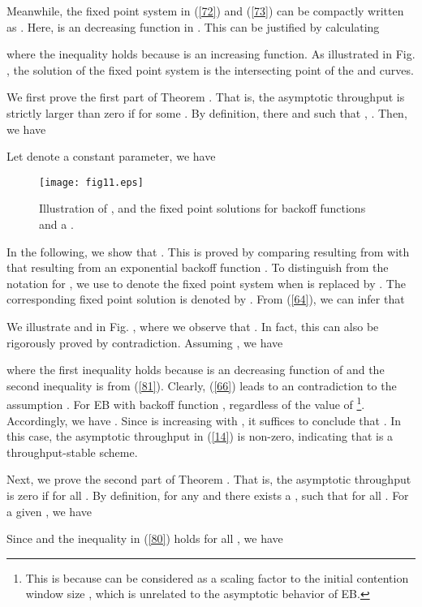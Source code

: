 \documentclass[journal]{IEEEtran}
\begin{document}
Meanwhile, the fixed point system in (\ref{72}) and (\ref{73}) can be compactly written as . Here,  is an decreasing function in . This can be justified by calculating

where the inequality holds because  is an increasing function. As illustrated in Fig. , the solution of the fixed point system is the intersecting point of the  and  curves.

We first prove the first part of Theorem . That is, the asymptotic throughput is strictly larger than zero if  for some . By definition, there  and  such that , . Then, we have

Let  denote a constant parameter, we have


\begin{figure}
\centering
  \begin{center}
    \texttt{[image: fig11.eps]}
  \end{center}
  \caption{Illustration of ,  and the fixed point solutions for backoff functions  and a .}
  \label{79}
\end{figure}

In the following, we show that . This is proved by comparing  resulting from  with that resulting from an exponential backoff function . To distinguish from the notation  for , we use  to denote the fixed point system when  is replaced by . The corresponding fixed point solution is denoted by . From (\ref{64}), we can infer that

We illustrate  and  in Fig. , where we observe that . In fact, this can also be rigorously proved by contradiction. Assuming , we have

where the first inequality holds because  is an decreasing function of  and the second inequality is from (\ref{81}). Clearly, (\ref{66}) leads to an contradiction to the assumption . For EB with backoff function ,  regardless of the value of  \footnote{This is because  can be considered as a scaling factor to the initial contention window size , which is unrelated to the asymptotic behavior of EB.}. Accordingly, we have . Since  is increasing with , it suffices to conclude that . In this case, the asymptotic throughput in (\ref{14}) is non-zero, indicating that  is a throughput-stable scheme.

Next, we prove the second part of Theorem . That is, the asymptotic throughput is zero if  for all . By definition, for any  and  there exists a , such that  for all . For a given , we have

Since  and the inequality in (\ref{80}) holds for all , we have
\end{document}
